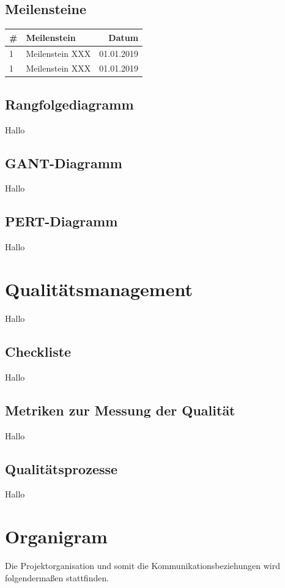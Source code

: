 \documentclass[a4paper,10pt]{scrartcl}
\begin{document}
\subsection{Meilensteine}
\begin{tabular}{llr} 
\toprule
\textbf{\#} & \textbf{Meilenstein} & \textbf{Datum}\\ 
\midrule 
\midrule
1  & Meilenstein XXX & 01.01.2019\\
\midrule
1  & Meilenstein XXX & 01.01.2019\\
\bottomrule
\end{tabular}

\vspace{5mm}

\subsection{Rangfolgediagramm}
Hallo

\subsection{GANT-Diagramm}
Hallo

\subsection{PERT-Diagramm}
Hallo

\section{Qualitätsmanagement}
Hallo

\subsection{Checkliste}
Hallo

\subsection{Metriken zur Messung der Qualität}
Hallo

\subsection{Qualitätsprozesse}
Hallo

\section{Organigram}
Die Projektorganisation und somit die Kommunikationsbeziehungen wird folgendermaßen stattfinden.
\hfill \vspace{5mm}
\end{document}
